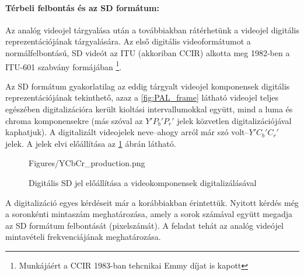 \paragraph{Térbeli felbontás és az SD formátum:\\}

Az analóg videojel tárgyalása után a továbbiakban rátérhetünk a videojel digitális reprezentációjának tárgyalására.
Az első digitális videoformátumot a normálfelbontású, SD videót az ITU (akkoriban CCIR) alkotta meg 1982-ben a ITU-601 szabvány formájában \footnote{Munkájáért a CCIR 1983-ban tehcnikai Emmy díjat is kapott}.

Az SD formátum gyakorlatilag az eddig tárgyalt videojel komponensek digitális reprezentációjának tekinthető, azaz a \ref{fig:PAL_frame} látható videojel teljes egészében digitalizációra került kioltási intervallumokkal együtt, mind a luma és chroma komponensekre (más szóval az $Y'P_b'P_r'$ jelek közvetlen digitalizációjával kaphatjuk).
A digitalizált videojelek neve--ahogy arról már szó volt--$Y'C_b'C_r'$ jelek.
A jelek elvi előállítása az \ref{Fig:SD_production} ábrán látható.
\begin{figure}[]
	\centering
	\begin{overpic}[width = 0.8 \columnwidth ]{Figures/YCbCr_production.png}
	\end{overpic}
	\caption{Digitális SD jel előállítása a videokomponensek digitalizálásával}
	\label{Fig:SD_production}
\end{figure}


A digitalizáció egyes kérdéseit már a korábbiakban érintettük.
Nyitott kérdés még a soronkénti mintaszám meghatározása, amely a sorok számával együtt megadja az SD formátum felbontását (pixelszámát).
A feladat tehát az analóg videójel mintavételi frekvenciájának meghatározása.

